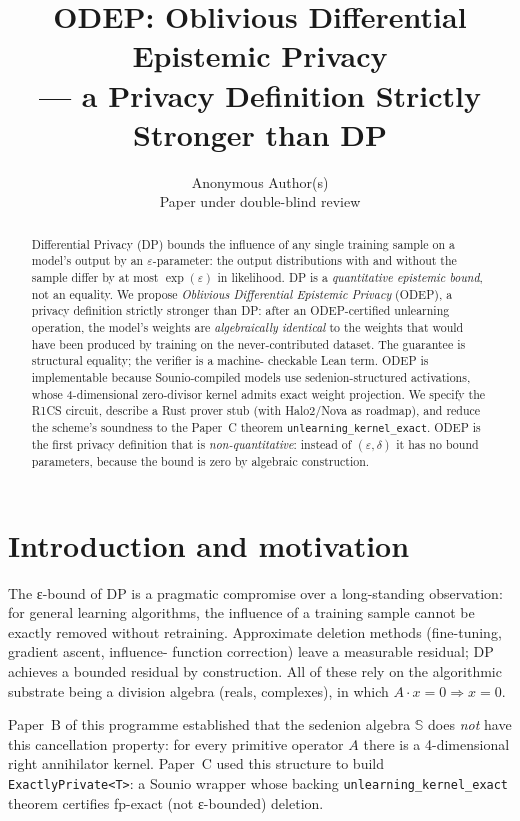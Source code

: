 \documentclass{article}
\title{ODEP: Oblivious Differential Epistemic Privacy\\
       — a Privacy Definition Strictly Stronger than DP}
\author{Anonymous Author(s)\\ Paper under double-blind review}
\begin{document}
\maketitle

\begin{abstract}
Differential Privacy (DP) bounds the influence of any single training
sample on a model's output by an $\varepsilon$-parameter: the output
distributions with and without the sample differ by at most
$\exp(\varepsilon)$ in likelihood.  DP is a \emph{quantitative
epistemic bound}, not an equality.  We propose \emph{Oblivious
Differential Epistemic Privacy} (ODEP), a privacy definition strictly
stronger than DP: after an ODEP-certified unlearning operation, the
model's weights are \emph{algebraically identical} to the weights that
would have been produced by training on the never-contributed dataset.
The guarantee is structural equality; the verifier is a machine-
checkable Lean term.  ODEP is implementable because Sounio-compiled
models use sedenion-structured activations, whose 4-dimensional
zero-divisor kernel admits exact weight projection.  We specify the
R1CS circuit, describe a Rust prover stub (with Halo2/Nova as
roadmap), and reduce the scheme's soundness to the Paper~C theorem
\texttt{unlearning\_kernel\_exact}.  ODEP is the first privacy
definition that is \emph{non-quantitative}: instead of
$(\varepsilon, \delta)$ it has no bound parameters, because the bound
is zero by algebraic construction.
\end{abstract}

\section{Introduction and motivation}

The ε-bound of DP is a pragmatic compromise over a long-standing
observation: for general learning algorithms, the influence of a
training sample cannot be exactly removed without retraining.
Approximate deletion methods (fine-tuning, gradient ascent, influence-
function correction) leave a measurable residual; DP achieves a
bounded residual by construction.  All of these rely on the
algorithmic substrate being a division algebra (reals, complexes), in
which \(A \cdot x = 0 \Rightarrow x = 0\).

Paper~B of this programme established that the sedenion algebra
\(\mathbb{S}\) does \emph{not} have this cancellation property: for
every primitive operator \(A\) there is a 4-dimensional right
annihilator kernel.  Paper~C used this structure to build
\texttt{ExactlyPrivate<T>}: a Sounio wrapper whose backing
\texttt{unlearning\_kernel\_exact} theorem certifies fp-exact (not
ε-bounded) deletion.
\end{document}
